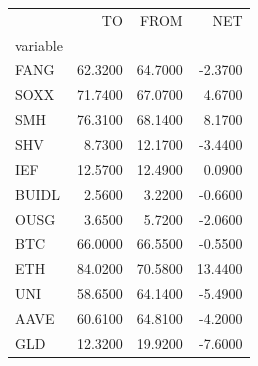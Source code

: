 \begin{tabular}{lrrr}
\toprule
 & TO & FROM & NET \\
variable &  &  &  \\
\midrule
FANG & 62.3200 & 64.7000 & -2.3700 \\
SOXX & 71.7400 & 67.0700 & 4.6700 \\
SMH & 76.3100 & 68.1400 & 8.1700 \\
SHV & 8.7300 & 12.1700 & -3.4400 \\
IEF & 12.5700 & 12.4900 & 0.0900 \\
BUIDL & 2.5600 & 3.2200 & -0.6600 \\
OUSG & 3.6500 & 5.7200 & -2.0600 \\
BTC & 66.0000 & 66.5500 & -0.5500 \\
ETH & 84.0200 & 70.5800 & 13.4400 \\
UNI & 58.6500 & 64.1400 & -5.4900 \\
AAVE & 60.6100 & 64.8100 & -4.2000 \\
GLD & 12.3200 & 19.9200 & -7.6000 \\
\bottomrule
\end{tabular}
